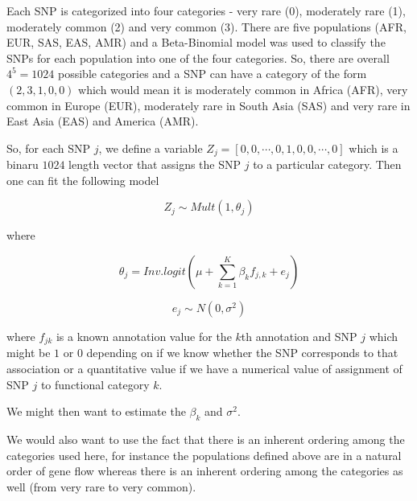 \documentclass[a4paper, 12pt]{article}
\begin{document}
Each SNP is categorized into four categories - very rare (0), moderately rare (1), moderately common (2) and very common (3). There are five populations (AFR, EUR, SAS, EAS, AMR) and a Beta-Binomial model was used to classify the SNPs for each population into one of the four categories. So, there are overall $4^5=1024$ possible categories and a SNP can have a category of the form $(2,3,1,0,0)$ which would mean it is moderately common in Africa (AFR), very common in Europe (EUR), moderately rare in South Asia (SAS) and very rare in East Asia (EAS) and America (AMR).

So, for each SNP $j$, we define a variable $Z_{j} = \left [ 0,0, \cdots, 0, 1, 0, 0, \cdots, 0 \right ]$ which is a binaru $1024$ length vector that assigns the SNP $j$ to a particular category. Then one can fit the following model 

$$ Z_{j} \sim Mult(1, \theta_{j}) $$

where 

$$ \theta_{j} = Inv.logit (\mu + \sum_{k=1}^{K} \beta_{k} f_{j,k} + e_{j}) $$

$$ e_{j} \sim N(0, \sigma^2) $$

where $f_{jk}$ is a known annotation value for the $k$th annotation and SNP $j$ which might be $1$ or $0$ depending on
if we know whether the SNP corresponds to that association or a quantitative value if we have a numerical value of assignment of SNP $j$ to functional category $k$. 

We might then want to estimate the $\beta_{k}$ and $\sigma^2$.

We would also want to use the fact that there is an inherent ordering among the categories used here, for instance the populations defined above are in a natural order of gene flow whereas there is an inherent ordering among the categories as well (from very rare to very common).
\end{document}
